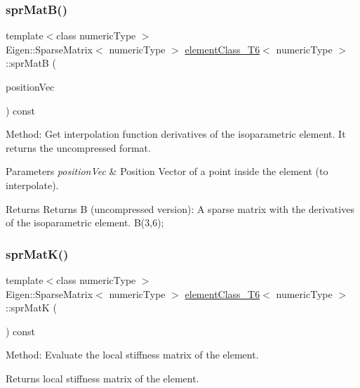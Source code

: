 \subsubsection{\texorpdfstring{spr\+Mat\+B()}{sprMatB()}}
{\footnotesize\ttfamily template$<$class numeric\+Type $>$ \\
Eigen\+::\+Sparse\+Matrix$<$ numeric\+Type $>$ \mbox{\hyperlink{classelement_class___t6}{element\+Class\+\_\+\+T6}}$<$ numeric\+Type $>$\+::spr\+MatB (\begin{DoxyParamCaption}\item[{const Matrix$<$ numeric\+Type, 2, 1 $>$ \&}]{position\+Vec }\end{DoxyParamCaption}) const}

Method\+: Get interpolation function derivatives of the isoparametric element. It returns the uncompressed format. 
\begin{DoxyParams}{Parameters}
{\em position\+Vec} & Position Vector of a point inside the element (to interpolate). \\
\hline
\end{DoxyParams}
\begin{DoxyReturn}{Returns}
Returns B (uncompressed version)\+: A sparse matrix with the derivatives of the isoparametric element. B(3,6); 
\end{DoxyReturn}
\mbox{\label{classelement_class___t6_a7f9d1575134a4afe28a5505ce4e6de4d}} 
\subsubsection{\texorpdfstring{spr\+Mat\+K()}{sprMatK()}}
{\footnotesize\ttfamily template$<$class numeric\+Type $>$ \\
Eigen\+::\+Sparse\+Matrix$<$ numeric\+Type $>$ \mbox{\hyperlink{classelement_class___t6}{element\+Class\+\_\+\+T6}}$<$ numeric\+Type $>$\+::spr\+MatK (\begin{DoxyParamCaption}{ }\end{DoxyParamCaption}) const}

Method\+: Evaluate the local stiffness matrix of the element. \begin{DoxyReturn}{Returns}
local stiffness matrix of the element. 
\end{DoxyReturn}
\mbox{\label{classelement_class___t6_ad8f57028dfbb4215979ef16b88d65957}} 
